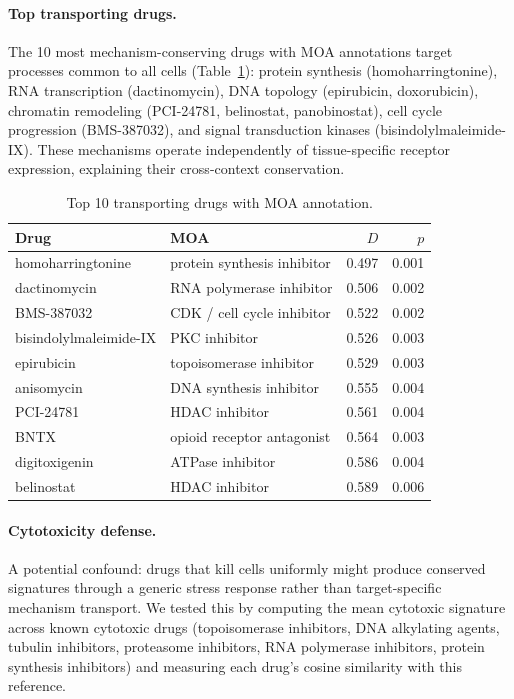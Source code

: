 \documentclass[11pt]{article}
\begin{document}
\paragraph{Top transporting drugs.}

The 10 most mechanism-conserving drugs with MOA annotations target processes
common to all cells (Table~\ref{tab:top}): protein synthesis
(homoharringtonine), RNA transcription (dactinomycin), DNA topology
(epirubicin, doxorubicin), chromatin remodeling (PCI-24781, belinostat,
panobinostat), cell cycle progression (BMS-387032), and signal transduction
kinases (bisindolylmaleimide-IX). These mechanisms operate independently
of tissue-specific receptor expression, explaining their cross-context
conservation.

\begin{table}[t]
\centering
\caption{Top 10 transporting drugs with MOA annotation.}
\label{tab:top}
\small
\begin{tabular}{llrr}
\toprule
Drug & MOA & $D$ & $p$ \\
\midrule
homoharringtonine & protein synthesis inhibitor & 0.497 & 0.001 \\
dactinomycin & RNA polymerase inhibitor & 0.506 & 0.002 \\
BMS-387032 & CDK / cell cycle inhibitor & 0.522 & 0.002 \\
bisindolylmaleimide-IX & PKC inhibitor & 0.526 & 0.003 \\
epirubicin & topoisomerase inhibitor & 0.529 & 0.003 \\
anisomycin & DNA synthesis inhibitor & 0.555 & 0.004 \\
PCI-24781 & HDAC inhibitor & 0.561 & 0.004 \\
BNTX & opioid receptor antagonist & 0.564 & 0.003 \\
digitoxigenin & ATPase inhibitor & 0.586 & 0.004 \\
belinostat & HDAC inhibitor & 0.589 & 0.006 \\
\bottomrule
\end{tabular}
\end{table}

\paragraph{Cytotoxicity defense.}

A potential confound: drugs that kill cells uniformly might produce
conserved signatures through a generic stress response rather than
target-specific mechanism transport. We tested this by computing the
mean cytotoxic signature across known cytotoxic drugs (topoisomerase
inhibitors, DNA alkylating agents, tubulin inhibitors, proteasome
inhibitors, RNA polymerase inhibitors, protein synthesis inhibitors)
and measuring each drug's cosine similarity with this reference.
\end{document}
